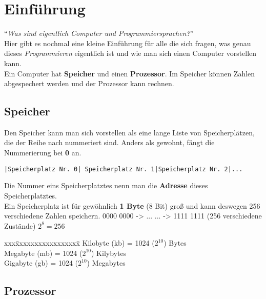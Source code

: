 \documentclass[c_worksheet.tex]{subfiles}
\begin{document}
\chapter{Einführung}

``\textit{Was sind eigentlich Computer und Programmiersprachen?}''\\
Hier gibt es nochmal eine kleine Einführung für alle die sich fragen, was genau dieses \textit{Programmieren} eigentlich ist und wie man sich einen Computer vorstellen kann.\\

Ein Computer hat \textbf{Speicher} und einen \textbf{Prozessor}. Im Speicher können Zahlen abgespechert werden und der Prozessor kann rechnen. \\

\section{Speicher}

Den Speicher kann man sich vorstellen als eine lange Liste von Speicherplätzen, die der Reihe nach nummeriert sind. Anders als gewohnt, fängt die Nummerierung bei \textbf{0} an. \\

\begin{lstlisting}[numbers=none, backgroundcolor=\color{lightgray}, frame=lrtb]
|Speicherplatz Nr. 0| Speicherplatz Nr. 1|Speicherplatz Nr. 2|...
\end{lstlisting}

\vspace{3pt}
Die Nummer eins Speicherplatztes nenn man die \textbf{Adresse} dieses Speicherplatztes. \\
Ein Speicherplatz ist für gewöhnlich \textbf{1 Byte} (8 Bit) groß und kann deswegen 256 verschiedene Zahlen speichern.
0000 0000 -> ...  ... -> 1111 1111 (256 verschiedene Zustände) $2^8 = 256$ \\

\begin{tabbing}
xxx\=xxxxxxxxxxxxxxxxx\=  \kill
{} Kilobyte (kb) \>= 1024 ($2^{10}$) Bytes\\
 Megabyte (mb) \>= 1024 ($2^{10}$) Kilybytes\\
 Gigabyte (gb) \>= 1024 ($2^{10}$) Megabytes\\
\end{tabbing}

\newpage
\section{Prozessor}
\end{document}
